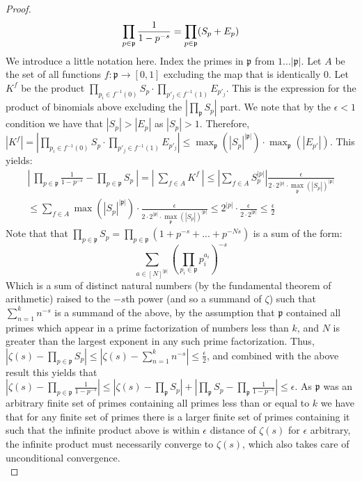 \documentclass{article}
\newcommand{\fk}[1]{\mathfrak{#1}}
\begin{document}
\begin{proof}
    \[
      \prod_{p \in \fk{p}} \frac{1}{1 - p^{-s}} = \prod_{p \in \fk{p}}(S_{p} + E_{p}) \\
    \]
    We introduce a little notation here. Index the primes in $\fk{p}$ from $1...|\fk{p}|$. Let $A$ be the set of all functions $f: \fk{p} \to [0,1]$ excluding the map that is identically $0$. Let $K^{f}$ be the product $\prod_{p_{i} \in f^{-1}(0)}S_{p} \cdot \prod_{p'_{j} \in f^{-1}(1)}E_{p'_{j}}$. This is the expression for the product of binomials above excluding the $|\prod_{\fk{p}}S_{p}|$ part. We note that by the $\epsilon < 1$ condition we have that $|S_{p}| > |E_{p}|$ as $|S_{p}| > 1$. Therefore, $|K^{f}| = |\prod_{p_{i} \in f^{-1}(0)}S_{p} \cdot \prod_{p'_{j} \in f^{-1}(1)}E_{p'_{j}}| \leq \max_{\fk{p}}(|S_{p}|^{|\fk{p}|}) \cdot \max_{\fk{p}}(|E_{p'}|)$. This yields:
    \begin{align*}
      \left| \ \prod_{p \in \fk{p}} \frac{1}{1 - p^{-s}} - \prod_{p \in \fk{p}}S_{p} \ \right| =  \left| \ \sum_{f \in A}K^{f} \ \right| \leq \left| \sum_{f \in A} S_{p}^{|p|} \right| \frac{\epsilon}{2 \cdot 2^{|p|} \cdot \max_{\fk{p}}(|S_{p}|)^{|\fk{p}|}} \\      \leq \sum_{f\in A}\max(|S_{p}|^{|\fk{p}|}) \cdot \frac{\epsilon}{2 \cdot 2^{|\fk{p}|} \cdot \max_{\fk{p}}(|S_{p}|)^{|\fk{p}|}}  \leq 2^{|p|} \cdot \frac{\epsilon}{2 \cdot 2^{|\fk{p}|}} \leq \frac{\epsilon}{2} 
    \end{align*}
    Note that that $\prod_{p \in \fk{p}}S_{p} = \prod_{p \in \fk{p}}(1+p^{-s}+...+p^{-Ns})$ is a sum of the form:
    \[
      \sum_{a \in [N]^{|\fk{p}|}} \left(\prod_{p_{i} \in \fk{p}}p_{i}^{a_{i}}\right)^{-s}
    \]
    Which is a sum of distinct natural numbers (by the fundamental theorem of arithmetic) raised to the $-s$th power (and so a summand of $\zeta$) such that $\sum_{n=1}^{k}n^{-s}$ is a summand of the above, by the assumption that $\fk{p}$ contained all primes which appear in a prime factorization of numbers less than $k$, and $N$ is greater than the largest exponent in any such prime factorization. Thus, $|\zeta(s) - \prod_{p \in \fk{p}}S_{p}| \leq |\zeta(s) - \sum_{n=1}^{k}n^{-s}| \leq \frac{\epsilon}{2}$, and combined with the above result this yields that $|\zeta(s) - \prod_{p \in \fk{p}}\frac{1}{1-p^{-s}}| \leq |\zeta(s) - \prod_{\fk{p}}S_{p}| + |\prod_{\fk{p}}S_{p} - \prod_{\fk{p}}\frac{1}{1-p^{-s}}| \leq \epsilon$. As $\fk{p}$ was an arbitrary finite set of primes containing all primes less than or equal to $k$ we have that for any finite set of primes there is a larger finite set of primes containing it such that the infinite product above is within $\epsilon$ distance of $\zeta(s)$ for $\epsilon$ arbitrary, the infinite product must necessarily converge to $\zeta(s)$, which also takes care of unconditional convergence. \\

\end{proof}
\end{document}
